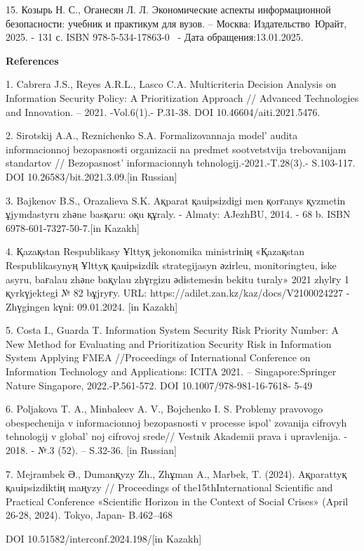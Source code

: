 15. Козырь Н. С., Оганесян Л. Л. Экономические аспекты информационной
безопасности: учебник и практикум для вузов. -- Москва:
Издательство~Юрайт, 2025. - 131 с. ISBN 978-5-534-17863-0
\href{https://urait.ru/bcode/568708}{}~-
Дата обращения:13.01.2025.

{\bfseries References}

1. Cabrera J.S., Reyes A.R.L., Lasco C.A. Multicriteria Decision Analysis
on Information Security Policy: A Prioritization Approach // Advanced
Technologies and Innovation. -- 2021. -Vol.6(1).- P.31-38. DOI
10.46604/aiti.2021.5476.

2. Sirotskij A.A., Reznichenko S.A. Formalizovannaja
model'{} audita informacionnoj bezopasnosti organizacii
na predmet sootvetstvija trebovanijam standartov //
Bezopasnost'{} informacionnyh tehnologij.-2021.-T.28(3).-
S.103-117. DOI 10.26583/bit.2021.3.09.{[}in Russian{]}

3. Bajkenov B.S., Orazalieva S.K. Aқparat қauіpsіzdіgі men қorғanys
қyzmetіn ұjymdastyru zhәne basқaru: oқu құraly. - Almaty: AJezhBU, 2014.
- 68 b. ISBN 6978-601-7327-50-7.{[}in Kazakh{]}

4. Қazaқstan Respublikasy Ұlttyқ jekonomika ministrіnің «Қazaқstan
Respublikasynyң Ұlttyқ қauіpsіzdіk strategijasyn әzіrleu, monitoringteu,
іske asyru, baғalau zhәne baқylau zhүrgіzu әdіstemesіn bekіtu turaly»
2021 zhylғy 1 қyrkүjektegі № 82 bұjryғy. URL:
https://adilet.zan.kz/kaz/docs/V2100024227 - Zhүgіngen kүnі: 09.01.2024.
{[}in Kazakh{]}

5. Costa I., Guarda T. Information System Security Risk Priority Number:
A New Method for Evaluating and Prioritization Security Risk in
Information System Applying FMEA //Proceedings of International
Conference on Information Technology and Applications: ICITA 2021. --
Singapore:Springer Nature Singapore, 2022.-P.561-572. DOI
10.1007/978-981-16-7618- 5-49

6. Poljakova T. A., Minbaleev A. V., Bojchenko I. S. Problemy pravovogo
obespechenija v informacionnoj bezopasnosti v processe
ispol' zovanija cifrovyh tehnologij v
global' noj cifrovoj srede// Vestnik Akademii prava i
upravlenija. - 2018. - №.3 (52). -- S.32-36. {[}in Russian{]}

7. Mejrambek Ә., Dumanқyzy Zh., Zhұman A., Marbek, T. (2024). Aқparattyқ
қauіpsіzdіktің maңyzy // Proceedings of the15thInternational Scientific
and Practical Conference «Scientific Horizon in the Context of Social
Crises» (April 26-28, 2024). Tokyo, Japan- B.462--468

DOI 10.51582/interconf.2024.198/{[}in Kazakh{]}

